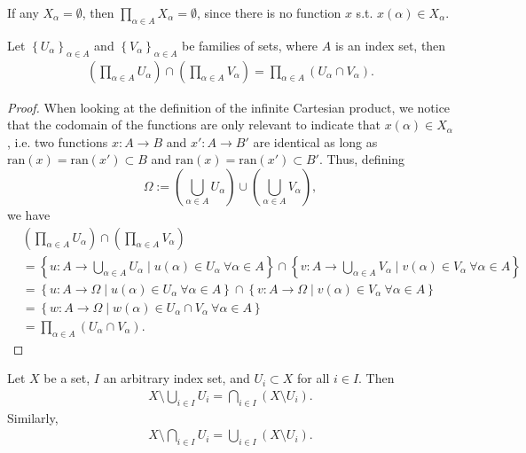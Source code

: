 \begin{remark}
	If any $X_{\alpha} = \emptyset$, then $\prod_{\alpha\in A}X_{\alpha} = \emptyset$, since there is no function $x$ s.t. $x(\alpha) \in X_{\alpha}$.
\end{remark}

\begin{theorem}\label{thrm:intersection_inf_Cart_prod}
	Let $\left\{U_{\alpha}\right\}_{\alpha\in A}$ and $\left\{V_{\alpha}\right\}_{\alpha\in A}$ be families of sets, where $A$ is an index set, then 
	\begin{align}\label{eq:intersection_inf_Cart_prod}
		\left(\prod_{\alpha\in A}U_{\alpha}\right) \cap \left(\prod_{\alpha\in A}V_{\alpha}\right) = \prod_{\alpha\in A}\left(U_{\alpha}\cap V_{\alpha}\right).
	\end{align}
\end{theorem}

\begin{proof}
	When looking at the definition of the infinite Cartesian product, we notice that the codomain of the functions are only relevant to indicate that $x(\alpha)\in X_{\alpha}$, i.e. two functions $x: A\to B$ and $x': A\to B'$ are identical as long as $\text{ran}(x) = \text{ran}(x') \subset B$ and $\text{ran}(x) = \text{ran}(x') \subset B'$. Thus, defining $$\Omega := \left(\bigcup_{\alpha\in A}U_{\alpha}\right)\cup \left(\bigcup_{\alpha\in A}V_{\alpha}\right),$$ we have
	\begin{align*}
		&\left(\prod_{\alpha\in A}U_{\alpha}\right) \cap \left(\prod_{\alpha\in A}V_{\alpha}\right) 
		\\ &= \left\{ u: A\to \bigcup_{\alpha\in A}U_{\alpha} \mid u(\alpha)\in U_{\alpha} \ \forall \alpha\in A\right\} \cap \left\{ v: A\to \bigcup_{\alpha\in A}V_{\alpha} \mid v(\alpha)\in V_{\alpha} \ \forall \alpha\in A\right\}
		\\ &= \left\{ u: A\to \Omega \mid u(\alpha)\in U_{\alpha}\ \forall\alpha\in A\right\} \cap \left\{ v: A\to \Omega \mid v(\alpha)\in V_{\alpha}\ \forall\alpha\in A\right\}
		\\ &= \left\{ w: A\to\Omega \mid w(\alpha)\in U_{\alpha}\cap V_{\alpha}\ \forall\alpha\in A 
		\right\}
		\\ &= \prod_{\alpha\in A}(U_{\alpha}\cap V_{\alpha}).
	\end{align*}
\end{proof}

\begin{theorem}\label{thrm:de_morgans_law}
	Let $X$ be a set, $I$ an arbitrary index set, and $U_i\subset X$ for all $i\in I$. Then 
	\begin{align}\label{eq:de_morgan_comp_union}
		X\setminus\bigcup_{i\in I}U_i = \bigcap_{i\in I}\left(X\setminus U_i\right).
	\end{align}
	Similarly, 
	\begin{align}\label{eq:de_morgan_comp_intersec}
		X\setminus \bigcap_{i\in I}U_i = \bigcup_{i\in I}\left(X\setminus U_i\right).
	\end{align}
\end{theorem}

